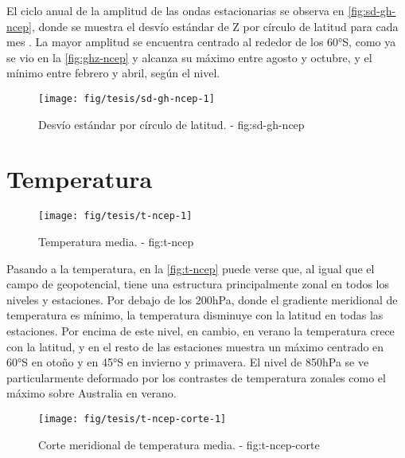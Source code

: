 \documentclass[spanish,a4paper]{book}
\begin{document}
El ciclo anual de la amplitud de las ondas estacionarias se observa en
\autoref{fig:sd-gh-ncep}, donde se muestra el desvío estándar de Z por
círculo de latitud para cada mes
. La
mayor amplitud se encuentra centrado al rededor de los 60°S, como ya se
vio en la \autoref{fig:ghz-ncep} y alcanza su máximo entre agosto y
octubre, y el mínimo entre febrero y abril, según el nivel.

\begin{figure}

{\centering \texttt{[image: fig/tesis/sd-gh-ncep-1]} 

}

\caption{Desvío estándar por círculo de latitud. - fig:sd-gh-ncep}\label{fig:sd-gh-ncep}
\end{figure}

\section{Temperatura}\label{temperatura}

\begin{landscape}\begin{figure}

{\centering \texttt{[image: fig/tesis/t-ncep-1]} 

}

\caption{Temperatura media. - fig:t-ncep}\label{fig:t-ncep}
\end{figure}
\end{landscape}

Pasando a la temperatura, en la \autoref{fig:t-ncep} puede verse que, al
igual que el campo de geopotencial, tiene una estructura principalmente
zonal en todos los niveles y estaciones. Por debajo de los 200hPa, donde
el gradiente meridional de temperatura es mínimo, la temperatura
disminuye con la latitud en todas las estaciones. Por encima de este
nivel, en cambio, en verano la temperatura crece con la latitud, y en el
resto de las estaciones muestra un máximo centrado en 60°S en otoño y en
45°S en invierno y primavera. El nivel de 850hPa se ve particularmente
deformado por los contrastes de temperatura zonales como el máximo sobre
Australia en verano.

\begin{figure}

{\centering \texttt{[image: fig/tesis/t-ncep-corte-1]} 

}

\caption{Corte meridional de temperatura media. - fig:t-ncep-corte}\label{fig:t-ncep-corte}
\end{figure}
\end{document}
